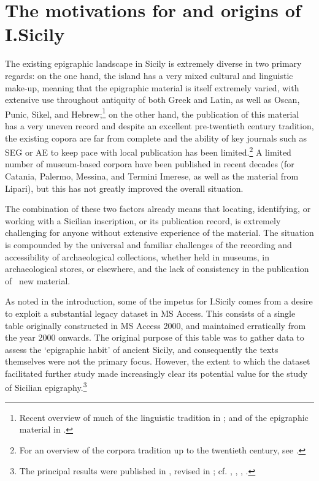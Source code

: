 \documentclass[amsthm,ebook]{saparticle}
\begin{document}
\section{The motivations for and origins of I.Sicily}
\noindent The existing epigraphic landscape in Sicily is extremely diverse in two primary regards: on the one hand, the island has
a very mixed cultural and linguistic make-up, meaning that the epigraphic material is itself extremely varied, with
extensive use throughout antiquity of both Greek and Latin, as well as Oscan, Punic, Sikel, and Hebrew;\footnote{
Recent overview of much of the linguistic tradition in \citet{tribulato_language_2012}; and of the epigraphic material in \citet{gulletta_sicilia_1999}.} on the other hand, the publication of this material has a very uneven record and despite an excellent
pre-twentieth century tradition, the existing copora are far from complete and the ability of key journals such as SEG
or AE to keep pace with local publication has been limited.\footnote{ For an overview of the corpora tradition up to
the twentieth century, see \citet{de_vido_corpora_1999}.} A limited number of museum-based corpora have been published in recent
decades (for Catania, Palermo, Messina, and Termini Imerese, as well as the material from Lipari), but this has not
greatly improved the overall situation.

The combination of these two factors already means that locating, identifying, or working with a Sicilian inscription,
or its publication record, is extremely challenging for anyone without extensive experience of the material. The
situation is compounded by the universal and familiar challenges of the recording and accessibility of archaeological
collections, whether held in museums, in archaeological stores, or elsewhere, and the lack of consistency in the
publication of \ new material.

As noted in the introduction, some of the impetus for I.Sicily comes from a desire to exploit a substantial legacy
dataset in MS Access. This consists of a single table originally constructed in MS Access 2000, and maintained
erratically from the year 2000 onwards. The original purpose of this table was to gather data to assess the `epigraphic
habit' of ancient Sicily, and consequently the texts themselves were not the primary focus. However, the extent to
which the dataset facilitated further study made increasingly clear its potential value for the study of Sicilian
epigraphy.\footnote{ The principal results were published in \citet{prag_epigraphy_2002}, revised in \citet[159-188]{prag_sicily_2004}; cf. \citet{prag_nouveau_2003}, \citet{prag_ciceronian_2007}, \citet{prag_sicilia_2008}, \citet{prag_sicilia_2010}.}
\end{document}
